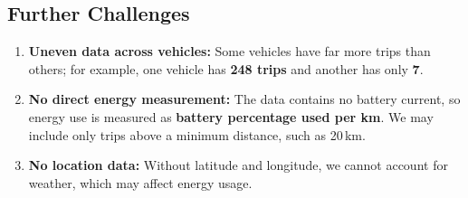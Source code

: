\documentclass[11pt,letterpaper]{article}
\begin{document}
\subsection{Further Challenges}
\begin{enumerate}
  \item \textbf{Uneven data across vehicles:} Some vehicles have far more trips than others; for example, one vehicle has \textbf{248 trips} and another has only \textbf{7}.
  \item \textbf{No direct energy measurement:} The data contains no battery current, so energy use is measured as \textbf{battery percentage used per km}. We may include only trips above a minimum distance, such as 20\,km.
  \item \textbf{No location data:} Without latitude and longitude, we cannot account for weather, which may affect energy usage.
\end{enumerate}
\end{document}
